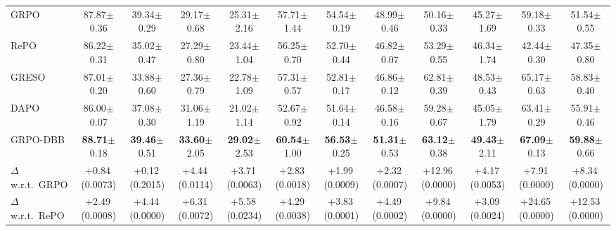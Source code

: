 \begin{table}[t]
{\begin{tabular}{lcccccc>{\columncolor{AvgCol}}c|ccc>{\columncolor{AvgCol}}c}
    \rowcolor{ModelRow}
    \multicolumn{12}{c}{\textbf{Qwen3-8B-Base} trained with \textbf{DAPO-Math-17k}} \\
    \midrule
    GRPO
    & 87.87{\tiny$\pm$0.36} & 39.34{\tiny$\pm$0.29} & 29.17{\tiny$\pm$0.68} & 25.31{\tiny$\pm$2.16} & 57.71{\tiny$\pm$1.44} & 54.54{\tiny$\pm$0.19} & 48.99{\tiny$\pm$0.46}
    & 50.16{\tiny$\pm$0.33} & 45.27{\tiny$\pm$1.69} & 59.18{\tiny$\pm$0.33} & 51.54{\tiny$\pm$0.55} \\
    RePO
    & 86.22{\tiny$\pm$0.31} & 35.02{\tiny$\pm$0.47} & 27.29{\tiny$\pm$0.80} & 23.44{\tiny$\pm$1.04} & 56.25{\tiny$\pm$0.70} & 52.70{\tiny$\pm$0.44} & 46.82{\tiny$\pm$0.07}
    & 53.29{\tiny$\pm$0.55} & 46.34{\tiny$\pm$1.74} & 42.44{\tiny$\pm$0.30} & 47.35{\tiny$\pm$0.80} \\
    GRESO
    & 87.01{\tiny$\pm$0.20} & 33.88{\tiny$\pm$0.60} & 27.36{\tiny$\pm$0.79} & 22.78{\tiny$\pm$1.09} & 57.31{\tiny$\pm$0.57} & 52.81{\tiny$\pm$0.17} & 46.86{\tiny$\pm$0.12}
    & 62.81{\tiny$\pm$0.39} & 48.53{\tiny$\pm$0.43} & 65.17{\tiny$\pm$0.63} & 58.83{\tiny$\pm$0.40} \\
    DAPO
    & 86.00{\tiny$\pm$0.07} & 37.08{\tiny$\pm$0.30} & 31.06{\tiny$\pm$1.19} & 21.02{\tiny$\pm$1.14} & 52.67{\tiny$\pm$0.92} & 51.64{\tiny$\pm$0.14} & 46.58{\tiny$\pm$0.16}
    & 59.28{\tiny$\pm$0.67} & 45.05{\tiny$\pm$1.79} & 63.41{\tiny$\pm$0.29} & 55.91{\tiny$\pm$0.46} \\
    \midrule
    GRPO-DBB
    & \textbf{88.71}{\tiny$\pm$0.18} & \textbf{39.46}{\tiny$\pm$0.51} & \textbf{33.60}{\tiny$\pm$2.05} & \textbf{29.02}{\tiny$\pm$2.53} & \textbf{60.54}{\tiny$\pm$1.00} & \textbf{56.53}{\tiny$\pm$0.25} & \textbf{51.31}{\tiny$\pm$0.53}
    & \textbf{63.12}{\tiny$\pm$0.38} & \textbf{49.43}{\tiny$\pm$2.11} & \textbf{67.09}{\tiny$\pm$0.13} & \textbf{59.88}{\tiny$\pm$0.66} \\
    $\Delta$ w.r.t.\ GRPO
    & +0.84{\tiny\,(0.0073)} & +0.12{\tiny\,(0.2015)} & +4.44{\tiny\,(0.0114)} & +3.71{\tiny\,(0.0063)} & +2.83{\tiny\,(0.0018)} & +1.99{\tiny\,(0.0009)} & +2.32{\tiny\,(0.0007)}
    & +12.96{\tiny\,(0.0000)} & +4.17{\tiny\,(0.0053)} & +7.91{\tiny\,(0.0000)} & +8.34{\tiny\,(0.0000)} \\
    $\Delta$ w.r.t.\ RePO
    & +2.49{\tiny\,(0.0008)} & +4.44{\tiny\,(0.0000)} & +6.31{\tiny\,(0.0072)} & +5.58{\tiny\,(0.0234)} & +4.29{\tiny\,(0.0038)} & +3.83{\tiny\,(0.0001)} & +4.49{\tiny\,(0.0002)}
    & +9.84{\tiny\,(0.0000)} & +3.09{\tiny\,(0.0024)} & +24.65{\tiny\,(0.0000)} & +12.53{\tiny\,(0.0000)} \\

\end{tabular}}
\end{table}
